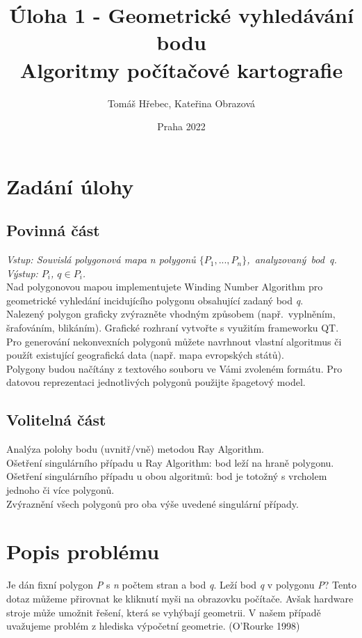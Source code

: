 \documentclass{article}
\title{%
   \Large{Úloha 1 - Geometrické vyhledávání bodu} \\
  \large{Algoritmy počítačové kartografie}}
\author{Tomáš Hřebec, Kateřina Obrazová}
\date{Praha 2022}
\begin{document}
\maketitle

\section{\large{Zadání úlohy}}
\subsection{\small{Povinná část}}
\textit{Vstup: Souvislá polygonová mapa n polygonů $\{P_{1}, ..., P_{n}\}$,~analyzovaný~bod~q.}
\vspace{0.2cm}\\
\textit{Výstup: $P_{i}$, $q\in P_{i}$.}
\vspace{0.2cm}\\
Nad polygonovou mapou implementujete Winding Number Algorithm pro geometrické vyhledání incidujícího polygonu obsahující zadaný bod \emph{q}.
\vspace{0.2cm}\\
Nalezený polygon graficky zvýrazněte vhodným způsobem (např.~vyplněním, šrafováním, blikáním). Grafické rozhraní vytvořte s využitím frameworku QT.
\vspace{0.2cm}\\
Pro generování nekonvexních polygonů můžete navrhnout vlastní algoritmus či použít existující geografická data (např. mapa evropských států). 
\vspace{0.2cm}\\
Polygony budou načítány z textového souboru ve Vámi zvoleném formátu. Pro datovou reprezentaci jednotlivých polygonů použijte špagetový model.
\subsection{\small{Volitelná část}}
Analýza polohy bodu (uvnitř/vně) metodou Ray Algorithm.
\vspace{0.2cm}\\
Ošetření singulárního případu u Ray Algorithm: bod leží na hraně polygonu. \vspace{0.2cm}\\
Ošetření singulárního případu u obou algoritmů: bod je totožný s vrcholem jednoho či více polygonů.
\vspace{0.2cm}\\
Zvýraznění všech polygonů pro oba výše uvedené singulární případy.
\clearpage
\newpage
\section{\large{Popis problému}}
Je dán fixní polygon \emph{P} s \emph{n} počtem stran a bod \emph{q}. Leží bod \emph{q} v polygonu \emph{P}? Tento dotaz můžeme přirovnat ke kliknutí myši na obrazovku počítače. Avšak hardware stroje může umožnit řešení, která se vyhýbají geometrii. V našem případě uvažujeme problém z hlediska výpočetní geometrie. (O'Rourke 1998) 
\end{document}
